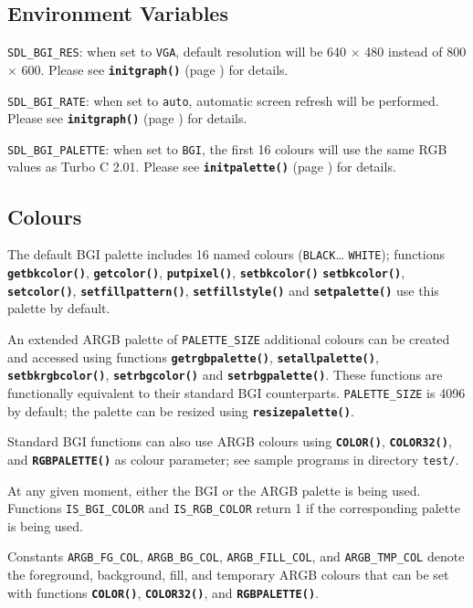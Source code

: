 \documentclass[a4paper,12pt]{article}
\newcommand{\func}[1]{\textbf{\texttt{#1}}}  %
\newcommand{\T}[1]{\texttt{#1}}     %
\newcommand{\file}[1]{\texttt{#1}}  %
\begin{document}

\subsection{Environment Variables}

\T{SDL\_BGI\_RES}: when set to \T{VGA}, default resolution will be 640
$\times$ 480 instead of 800 $\times$ 600. Please see
\func{initgraph()} (page \pageref{sec:initgraph}) for details.

\T{SDL\_BGI\_RATE}: when set to \T{auto}, automatic screen refresh
will be performed. Please see \func{initgraph()} (page
\pageref{sec:initgraph}) for details.

\T{SDL\_BGI\_PALETTE}: when set to \T{BGI}, the first 16 colours will
use the same RGB values as Turbo C 2.01. Please see
\func{initpalette()} (page \pageref{sec:initpalette}) for details.


\subsection{Colours}

The default BGI palette includes 16 named colours (\T{BLACK}{\ldots}
\T{WHITE}); functions \func{getbkcolor()}, \func{getcolor()},
\func{putpixel()}, \func{setbkcolor()} \func{setbkcolor()},
\func{setco\-lor()}, \func{setfillpattern()}, \func{setfillstyle()}
and \func{setpalette()} use this palette by default.

An extended ARGB palette of \T{PALETTE\_SIZE} additional colours can
be created and accessed using functions \func{getrgbpalette()},
\func{setallpalette()}, \func{setbkrgbcolor()}, \func{setrbgcolor()}
and \func{setrbgpalette()}. These functions are functionally
equivalent to their standard BGI counterparts. \T{PALETTE\_SIZE} is
4096 by default; the palette can be resized using
\func{resizepalette()}.

Standard BGI functions can also use ARGB colours using \func{COLOR()},
\func{COLOR32()}, and \func{RGBPALETTE()} as colour parameter; see
sample programs in directory \file{test/}.

At any given moment, either the BGI or the ARGB palette is being used.
Functions \T{IS\_BGI\_COLOR} and \T{IS\_RGB\_COLOR} return 1 if the
corresponding palette is being used.

Constants \T{ARGB\_FG\_COL}, \T{ARGB\_BG\_COL}, \T{ARGB\_FILL\_COL},
and \T{ARGB\_TMP\_COL} denote the foreground, background, fill, and
temporary ARGB colours that can be set with functions \func{COLOR()},
\func{COLOR32()}, and \func{RGBPALETTE()}.
\end{document}
